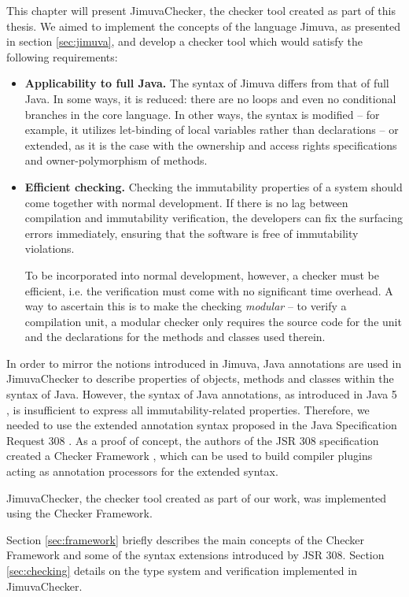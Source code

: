 \documentclass{pracamgr}
\begin{document}
This chapter will present JimuvaChecker, the checker tool created as
part of this thesis. We aimed to implement the concepts of the
language Jimuva, as presented in section \ref{sec:jimuva}, and develop
a checker tool which would satisfy the following requirements:
\begin{itemize}
\item \textbf{Applicability to full Java.} The syntax of Jimuva
  differs from that of full Java. In some ways, it is reduced: there
  are no loops and even no conditional branches in the core
  language. In other ways, the syntax is modified -- for example, it
  utilizes let-binding of local variables rather than declarations --
  or extended, as it is the case with the ownership and access rights
  specifications and owner-polymorphism of methods.
\item \textbf{Efficient checking.} Checking the immutability
  properties of a system should come together with normal
  development. If there is no lag between compilation and immutability
  verification, the developers can fix the surfacing errors
  immediately, ensuring that the software is free of immutability
  violations. 

  To be incorporated into normal development, however, a checker must
  be efficient, i.e. the verification must come with no significant
  time overhead. A way to ascertain this is to make the checking
  \emph{modular} -- to verify a compilation unit, a modular checker
  only requires the source code for the unit and the declarations for
  the methods and classes used therein.
\end{itemize}

In order to mirror the notions introduced in Jimuva, Java annotations
are used in JimuvaChecker to describe properties of objects, methods
and classes within the syntax of Java. However, the syntax of Java
annotations, as introduced in Java 5 \cite{jls3}, is insufficient to
express all immutability-related properties. Therefore, we needed to
use the extended annotation syntax proposed in the Java Specification
Request 308 \cite{jsr308}. As a proof of concept, the authors of the
JSR 308 specification created a Checker Framework \cite{checkers},
which can be used to build compiler plugins acting as annotation
processors for the extended syntax.

JimuvaChecker, the checker tool created as part of our work, was
implemented using the Checker Framework.

Section \ref{sec:framework} briefly describes the main concepts of the
Checker Framework and some of the syntax extensions introduced by JSR
308. Section \ref{sec:checking} details on the type system and
verification implemented in JimuvaChecker.
\end{document}
